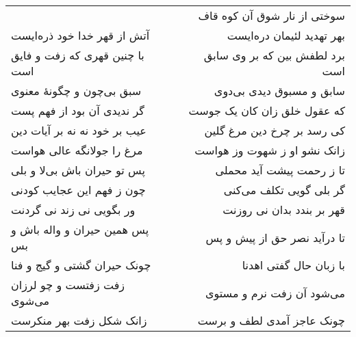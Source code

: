 \begin{center}
\begin{longtable}{l p{0.5cm} r}
&&
سوختی از نار شوق آن کوه قاف
\\
آتش از قهر خدا خود ذره‌ایست
&&
بهر تهدید لئیمان دره‌ایست
\\
با چنین قهری که زفت و فایق است
&&
برد لطفش بین که بر وی سابق است
\\
سبق بی‌چون و چگونهٔ معنوی
&&
سابق و مسبوق دیدی بی‌دوی
\\
گر ندیدی آن بود از فهم پست
&&
که عقول خلق زان کان یک جوست
\\
عیب بر خود نه نه بر آیات دین
&&
کی رسد بر چرخ دین مرغ گلین
\\
مرغ را جولانگه عالی هواست
&&
زانک نشو او ز شهوت وز هواست
\\
پس تو حیران باش بی‌لا و بلی
&&
تا ز رحمت پیشت آید محملی
\\
چون ز فهم این عجایب کودنی
&&
گر بلی گویی تکلف می‌کنی
\\
ور بگویی نی زند نی گردنت
&&
قهر بر بندد بدان نی روزنت
\\
پس همین حیران و واله باش و بس
&&
تا درآید نصر حق از پیش و پس
\\
چونک حیران گشتی و گیج و فنا
&&
با زبان حال گفتی اهدنا
\\
زفت زفتست و چو لرزان می‌شوی
&&
می‌شود آن زفت نرم و مستوی
\\
زانک شکل زفت بهر منکرست
&&
چونک عاجز آمدی لطف و برست
\\
\end{longtable}
\end{center}
